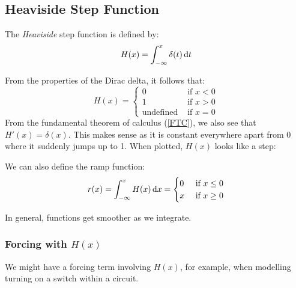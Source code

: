 \documentclass[../main.tex]{subfiles}
\begin{document}
\subsection{Heaviside Step Function}
\begin{definition}
  The \textit{Heaviside} step function is defined by:
  \[
    H(x) = \int_{-\infty}^{x} \delta(t) \d{t}
  \]
\end{definition}
From the properties of the Dirac delta, it follows that:
\[
  H(x) = \begin{cases}
  0 & \text{ if } x < 0 \\
  1 & \text{ if } x > 0 \\
  \text{undefined} & \text{ if } x = 0
  \end{cases}
\]
From the fundamental theorem of calculus (\cref{FTC}), we also see that $H'(x) = \delta(x)$.
This makes sense as it is constant everywhere apart from 0 where it suddenly jumps up to 1.
When plotted, $H(x)$ looks like a step:
\begin{center}
\end{center}
We can also define the ramp function:
\[
  r(x) = \int_{-\infty}^{x} H(x) \d{x} = \begin{cases}
  0 & \text{ if }x\leq0 \\
  x & \text{ if }x\geq 0
  \end{cases}
\]
\begin{center}
\end{center}
\begin{remark}
  In general, functions get smoother as we integrate.
\end{remark}
\subsubsection{Forcing with $H(x)$}
We might have a forcing term involving $H(x)$, for example, when modelling turning on a switch within a circuit.
\end{document}
